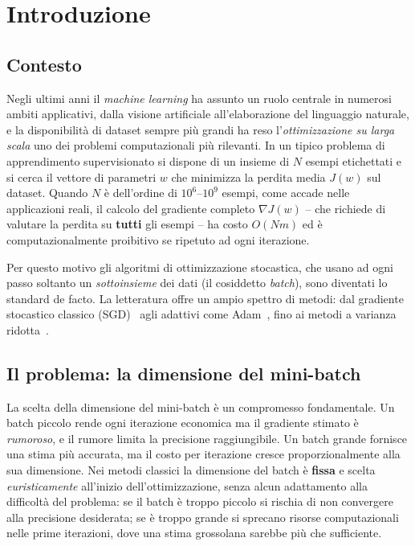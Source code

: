 \section{Introduzione}\label{sec:introduzione}

\subsection{Contesto}

Negli ultimi anni il \emph{machine learning} ha assunto un ruolo centrale in
numerosi ambiti applicativi, dalla visione artificiale all'elaborazione del
linguaggio naturale, e la disponibilità di dataset sempre più grandi ha reso
l'\emph{ottimizzazione su larga scala} uno dei problemi computazionali più
rilevanti. In un tipico problema di apprendimento supervisionato si dispone di
un insieme di $N$ esempi etichettati e si cerca il vettore di parametri $w$ che
minimizza la perdita media $J(w)$ sul dataset. Quando $N$ è dell'ordine di
$10^6$--$10^9$ esempi, come accade nelle applicazioni reali, il calcolo del
gradiente completo $\nabla J(w)$ -- che richiede di valutare la perdita su
\textbf{tutti} gli esempi -- ha costo $O(Nm)$ ed è computazionalmente
proibitivo se ripetuto ad ogni iterazione.

Per questo motivo gli algoritmi di ottimizzazione stocastica, che usano ad ogni
passo soltanto un \emph{sottoinsieme} dei dati (il cosiddetto \emph{batch}),
sono diventati lo standard de facto. La letteratura offre un ampio spettro di
metodi: dal gradiente stocastico classico (SGD)~\cite{robbins1951, bottou2008}
agli adattivi come Adam~\cite{kingma2015}, fino ai metodi a varianza
ridotta~\cite{defazio2014, johnson2013}.

\subsection{Il problema: la dimensione del mini-batch}

La scelta della dimensione del mini-batch è un compromesso fondamentale. Un
batch piccolo rende ogni iterazione economica ma il gradiente stimato è
\emph{rumoroso}, e il rumore limita la precisione raggiungibile. Un batch
grande fornisce una stima più accurata, ma il costo per iterazione cresce
proporzionalmente alla sua dimensione. Nei metodi classici la dimensione del
batch è \textbf{fissa} e scelta \emph{euristicamente} all'inizio
dell'ottimizzazione, senza alcun adattamento alla difficoltà del problema:
se il batch è troppo piccolo si rischia di non convergere alla precisione
desiderata; se è troppo grande si sprecano risorse computazionali nelle prime
iterazioni, dove una stima grossolana sarebbe più che sufficiente.

